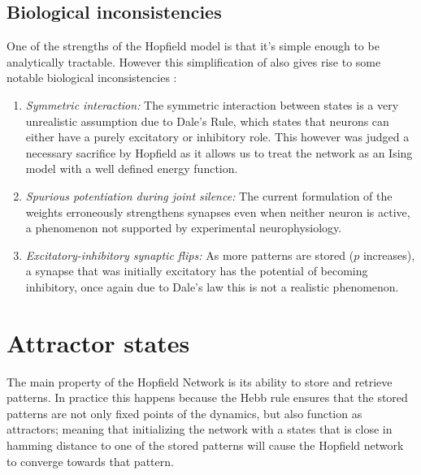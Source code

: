 \documentclass[a4paper,12pt]{report}
\begin{document}
\subsection*{Biological inconsistencies}
One of the strengths of the Hopfield model is that it's simple enough to be analytically
tractable. However this simplification of also gives rise to some notable biological 
inconsistencies \cite{Hertz2018}:
\begin{enumerate}
  \item\emph{Symmetric interaction:}  The symmetric interaction between states is a very 
  unrealistic assumption due to Dale's Rule, which states that neurons can either have 
  a purely excitatory or inhibitory role. This however was judged a necessary sacrifice
  by Hopfield as it allows us to treat the network as an Ising model with a well defined
  energy function.
  \item \emph{Spurious potentiation during joint silence:}  The current formulation 
  of the weights erroneously strengthens synapses even when neither neuron is active, 
  a phenomenon not supported by experimental neurophysiology.
  \item \emph{Excitatory-inhibitory synaptic flips:}  As more patterns are 
  stored (\(p\) increases), a synapse that was initially excitatory has the potential of
  becoming inhibitory, once again due to Dale's law this is not a realistic phenomenon.
\end{enumerate}

\section{Attractor states}
The main property of the Hopfield Network is its ability to store and retrieve patterns.
In practice this happens because the Hebb rule ensures that the stored patterns are not
only fixed points of the dynamics, but also function as attractors; meaning that 
initializing the network with a states that is close in hamming distance to one of the
stored patterns will cause the Hopfield network to converge towards that pattern.
\vspace{0.5em}
\end{document}
